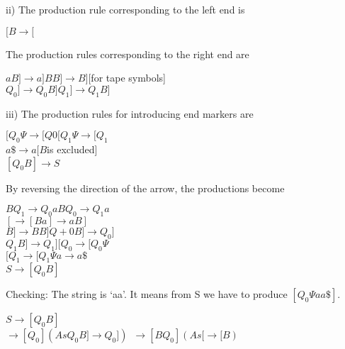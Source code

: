 \documentclass[b5paper,10pt]{article}
\begin{document}
ii) The production rule corresponding to the left end is

\begin{center}
$[B \rightarrow [$\\
\end{center}
The production rules corresponding to the right end are
\begin{center}
$aB] \rightarrow a] BB] \rightarrow B] $[for tape symbols]\\
$Q_0] \rightarrow Q_0B] Q_1] \rightarrow Q_1B]$\\
\end{center}

iii) The production rules for introducing end markers are

\begin{center}
$[Q_0\Psi → [Q0 [Q_1\Psi \rightarrow [Q_1$\\
$a\$ → a [B $is excluded]\\
$[Q_0B] \rightarrow S$\\
\end{center}

By reversing the direction of the arrow, the productions become
\begin{center}
$BQ_1 \rightarrow Q_0a BQ_0 \rightarrow Q_1a$\\
$[\rightarrow [Ba] \rightarrow aB]$\\
$B] \rightarrow BB] Q+0B] \rightarrow Q_0]$\\
$Q_1B] \rightarrow Q_1] [Q_0 \rightarrow [Q_0\Psi$\\
$[Q_1 \rightarrow [Q_1\Psi a \rightarrow a\$$\\
$S \rightarrow [Q_0B]$\\
\end{center}

Checking: The string is ‘aa’. It means from S we have to produce $[Q_0\Psi aa\$]$.
\begin{center}
$S \rightarrow [Q_0B]$\\
$\rightarrow [Q_0] (As Q_0B] \rightarrow Q_0])$\
$\rightarrow [BQ_0] (As [ \rightarrow [B)$\\
\end{center}
\end{document}
